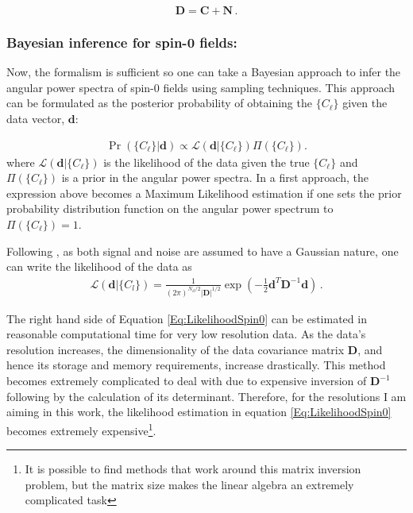 \begin{equation}
\textbf{D} = \textbf{C} + \textbf{N} \, .
\end{equation}

\subsubsection{Bayesian inference for spin-0 fields:}
\qquad Now, the formalism is sufficient so one can take a Bayesian approach to infer the angular power spectra of spin-0 fields using sampling techniques. This approach can be formulated as the posterior probability of obtaining the $\{C_{\ell}\}$ given the data vector, $\mathbf{d}$:

\begin{align}
\Pr (\{C_{\ell}\}|\mathbf{d}) \propto \mathcal{L} (\mathbf{d}|\{C_{\ell}\})\Pi(\{C_{\ell}\}).
\label{Eq:LikelFirstExpression}
\end{align}
\noindent where $\mathcal{L} (\mathbf{d}|\{C_{\ell}\})$ is the likelihood of the data given the true $\{C_{\ell}\}$ and $\Pi(\{C_{\ell}\})$ is a prior in the angular power spectra. In a first approach, the expression above becomes a Maximum Likelihood estimation \citep{1994Gorsky,1997Tegmark,Hobson2002,Efstat2004} if one sets the prior probability distribution function on the angular power spectrum to $\Pi(\{C_{\ell}\}) = 1$. 

\qquad Following \cite{Borrill1999,Hobson2002,Taylor2008}, as both signal and noise are assumed to have a Gaussian nature, one can write the likelihood of the data as
\begin{align}
\mathcal{L}(\mathbf{d}|\{C_{l}\}) = \frac{1}{(2\pi)^{N_d/2}|\mathbf{D}|^{1/2}}\exp \left(-\frac{1}{2}\mathbf{d}^T\mathbf{D}^{-1}\mathbf{d} \right)\, .
\label{Eq:LikelihoodSpin0}
\end{align}

\qquad The right hand side of Equation \eqref{Eq:LikelihoodSpin0} can be estimated in reasonable computational time for very low resolution data. As the data's resolution increases, the dimensionality of the data covariance matrix $\mathbf{D}$, and hence its storage and memory requirements, increase drastically. This method becomes extremely complicated to deal with due to expensive inversion of $\mathbf{D}^{-1}$ following by the calculation of its determinant. Therefore, for the resolutions I am aiming in this work, the likelihood estimation in equation \eqref{Eq:LikelihoodSpin0} becomes extremely expensive\footnote{It is possible to find methods that work around this matrix inversion problem, but the matrix size makes the linear algebra an extremely complicated task}. 

